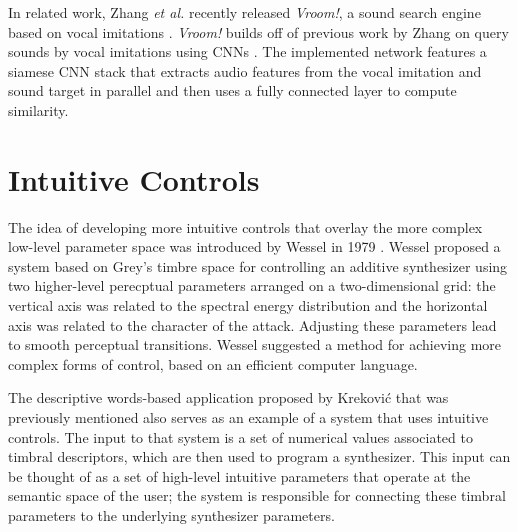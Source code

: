 
In related work, Zhang \textit{et al.} recently released \textit{Vroom!}, a sound search engine based on vocal imitations \cite{zhang2020vroom}. \textit{Vroom!} builds off of previous work by Zhang on query sounds by vocal imitations using CNNs \cite{zhang2017iminet, zhang2018visualization}. The implemented network features a siamese CNN stack that extracts audio features from the vocal imitation and sound target in parallel and then uses a fully connected layer to compute similarity.

\section{Intuitive Controls}
The idea of developing more intuitive controls that overlay the more complex low-level parameter space was introduced by Wessel in 1979 \cite{wessel1979timbre}. Wessel proposed a system based on Grey's timbre space \cite{grey1977multidimensional} for controlling an additive synthesizer using two higher-level perecptual parameters arranged on a two-dimensional grid: the vertical axis was related to the spectral energy distribution and the horizontal axis was related to the character of the attack. Adjusting these parameters lead to smooth perceptual transitions. Wessel suggested a method for achieving more complex forms of control, based on an efficient computer language.

The descriptive words-based application proposed by Krekovi\'{c} that was previously mentioned \cite{krekovic2016algorithm} also serves as an example of a system that uses intuitive controls. The input to that system is a set of numerical values associated to timbral descriptors, which are then used to program a synthesizer. This input can be thought of as a set of high-level intuitive parameters that operate at the semantic space of the user; the system is responsible for connecting these timbral parameters to the underlying synthesizer parameters.

